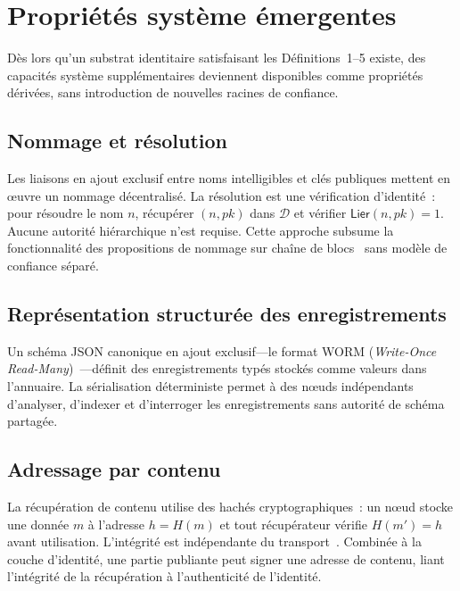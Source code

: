 \documentclass[11pt,a4paper]{article}
\begin{document}
\section{Propriétés système émergentes}
\label{sec:derivees}

Dès lors qu'un substrat identitaire satisfaisant les Définitions~1--5 existe,
des capacités système supplémentaires deviennent disponibles comme propriétés
dérivées, sans introduction de nouvelles racines de confiance.

\subsection{Nommage et résolution}

Les liaisons en ajout exclusif entre noms intelligibles et clés publiques
mettent en \oe{}uvre un nommage décentralisé.  La résolution est une
vérification d'identité~: pour résoudre le nom $n$, récupérer $(n, pk)$
dans $\mathcal{D}$ et vérifier $\mathsf{Lier}(n, pk) = 1$.  Aucune autorité
hiérarchique n'est requise.  Cette approche subsume la fonctionnalité des
propositions de nommage sur chaîne de blocs~\cite{handshake} sans modèle de
confiance séparé.

\subsection{Représentation structurée des enregistrements}

Un schéma JSON canonique en ajout exclusif---le format WORM (\emph{Write-Once
Read-Many})~\cite{worm}---définit des enregistrements typés stockés comme
valeurs dans l'annuaire.  La sérialisation déterministe permet à des n\oe{}uds
indépendants d'analyser, d'indexer et d'interroger les enregistrements sans
autorité de schéma partagée.

\subsection{Adressage par contenu}

La récupération de contenu utilise des hachés cryptographiques~: un n\oe{}ud
stocke une donnée $m$ à l'adresse $h = H(m)$ et tout récupérateur vérifie
$H(m') = h$ avant utilisation.  L'intégrité est indépendante du
transport~\cite{ipfs}.  Combinée à la couche d'identité, une partie
publiante peut signer une adresse de contenu, liant l'intégrité de la
récupération à l'authenticité de l'identité.
\end{document}
